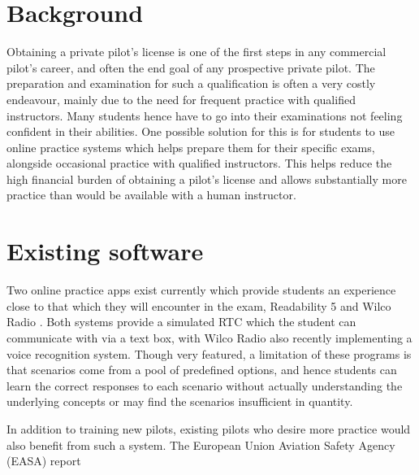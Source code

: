 \section{Background}
Obtaining a private pilot's license is one of the first steps in any commercial pilot's career, and often the end goal of any prospective private pilot.
The preparation and examination for such a qualification is often a very costly endeavour, mainly due to the need for frequent practice with qualified instructors.
Many students hence have to go into their examinations not feeling confident in their abilities.
One possible solution for this is for students to use online practice systems which helps prepare them for their specific exams, alongside occasional practice with qualified instructors.
This helps reduce the high financial burden of obtaining a pilot's license and allows substantially more practice than would be available with a human instructor.
\section{Existing software}
Two online practice apps exist currently which provide students an experience close to that which they will encounter in the exam, Readability 5 \cite{readability5} and Wilco Radio \cite{wilcoradio}.
Both systems provide a simulated RTC which the student can communicate with via a text box, with Wilco Radio also recently implementing a voice recognition system.
Though very featured, a limitation of these programs is that scenarios come from a pool of predefined options, and hence students can learn the correct responses to each scenario without actually understanding the underlying concepts or may find the scenarios insufficient in quantity.


In addition to training new pilots, existing pilots who desire more practice would also benefit from such a system. The European Union Aviation Safety Agency (EASA) report 
